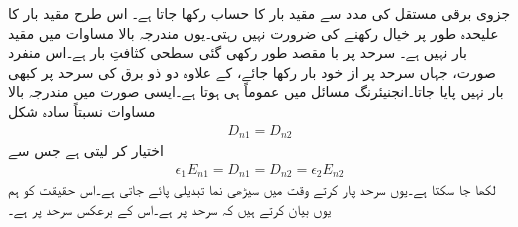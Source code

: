 جزوی برقی مستقل کی مدد سے مقید بار کا حساب رکھا جاتا ہے۔ اس طرح مقید بار  کا علیحدہ طور پر  خیال رکھنے کی ضرورت نہیں رہتی۔یوں مندرجہ بالا مساوات میں  مقید بار نہیں ہے۔  سرحد پر با مقصد طور   رکھی گئی سطحی کثافتِ بار ہے۔اس منفرد  صورت، جہاں سرحد پر از خود بار رکھا جائے،  کے علاوہ دو ذو برق کی سرحد پر کبھی بار نہیں پایا جاتا۔انجنیئرنگ مسائل میں عموماً  ہی ہوتا ہے۔ایسی صورت میں مندرجہ بالا مساوات نسبتاً سادہ شکل 
\begin{align}\label{مساوات_کپیسٹر_عمودی_برقی_بہاو_مسلسل_ہے}
D_{n1} =D_{n2}
\end{align}
اختیار کر لیتی ہے جس سے
\begin{align}
\epsilon_{1} E_{n1}= D_{n1}=D_{n2}=\epsilon_2 E_{n2}
\end{align}
لکھا جا سکتا ہے۔یوں سرحد پار کرتے وقت  میں سیڑھی نما تبدیلی پائے جاتی ہے۔اس حقیقت کو ہم یوں بیان کرتے ہیں کہ سرحد پر   ہے۔اس کے برعکس  سرحد پر  ہے۔

